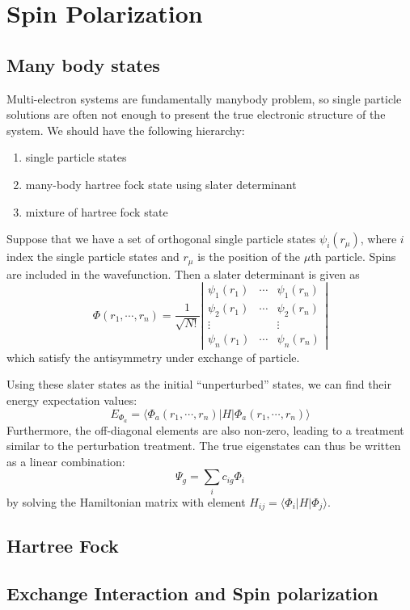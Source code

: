 \documentclass{article}
\newcommand{\statebra}[1]{\langle #1 |}
\newcommand{\stateket}[1]{| #1 \rangle}
\begin{document}
\section{Spin Polarization}
\subsection{Many body states}
Multi-electron systems are fundamentally manybody problem, so single particle 
solutions are often not enough to present the true electronic structure of the 
system. We should have the following hierarchy:
\begin{enumerate}
    \item single particle states
    \item many-body hartree fock state using slater determinant
    \item mixture of hartree fock state
\end{enumerate}
Suppose that we have a set of orthogonal single particle states $\psi_i(r_{\mu})$, where $i$
index the single particle states and $r_{\mu}$ is the position of the $\mu$th particle. 
Spins are included in the wavefunction. Then a slater determinant is given as
\begin{equation}
    \Phi(r_1, \cdots, r_n) = \frac{1}{\sqrt{N!}} 
    \left| \begin{matrix}
        \psi_1(r_1) & \cdots & \psi_1(r_n) \\ 
        \psi_2(r_1) & \cdots & \psi_2(r_n) \\
        \vdots &  & \vdots \\ 
        \psi_n(r_1) & \cdots & \psi_n(r_n)
    \end{matrix} \right|
\end{equation}
which satisfy the antisymmetry under exchange of particle. 

Using these slater states as the initial ``unperturbed'' states, we can find their 
energy expectation values:
\begin{equation}
    E_{\Phi_a} = \statebra{\Phi_a(r_1, \cdots, r_n)} H \stateket{\Phi_a(r_1, \cdots, r_n)}
\end{equation}
Furthermore, the off-diagonal elements are also non-zero, leading to a treatment similar 
to the perturbation treatment. The true eigenstates can thus be written as a linear combination:
\begin{equation}
    \Psi_g = \sum_{i} c_{ig} \Phi_i
\end{equation}
by solving the Hamiltonian matrix with element $H_{ij} = \statebra{\Phi_i} H \stateket{\Phi_j}$. 

\subsection{Hartree Fock}


\subsection{Exchange Interaction and Spin polarization}
\end{document}
